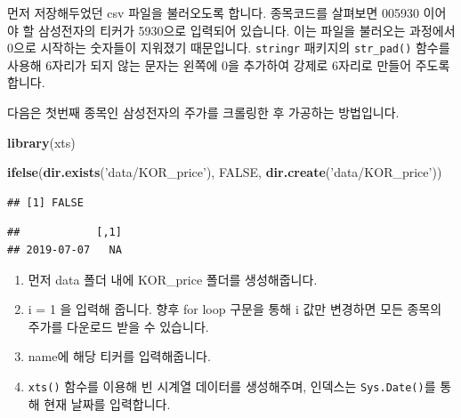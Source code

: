 \documentclass[12pt,]{book}
\newenvironment{Shaded}{\begin{snugshade}}{\end{snugshade}}
\newcommand{\DataTypeTok}[1]{\textcolor[rgb]{0.13,0.29,0.53}{#1}}
\newcommand{\DecValTok}[1]{\textcolor[rgb]{0.00,0.00,0.81}{#1}}
\newcommand{\KeywordTok}[1]{\textcolor[rgb]{0.13,0.29,0.53}{\textbf{#1}}}
\newcommand{\NormalTok}[1]{#1}
\newcommand{\OperatorTok}[1]{\textcolor[rgb]{0.81,0.36,0.00}{\textbf{#1}}}
\newcommand{\OtherTok}[1]{\textcolor[rgb]{0.56,0.35,0.01}{#1}}
\newcommand{\StringTok}[1]{\textcolor[rgb]{0.31,0.60,0.02}{#1}}
\providecommand{\tightlist}{%
  \setlength{\itemsep}{0pt}\setlength{\parskip}{0pt}}
\begin{document}
먼저 저장해두었던 csv 파일을 불러오도록 합니다. 종목코드를 살펴보면 005930 이어야 할 삼성전자의 티커가 5930으로 입력되어 있습니다. 이는 파일을 불러오는 과정에서 0으로 시작하는 숫자들이 지워졌기 때문입니다. \texttt{stringr} 패키지의 \texttt{str\_pad()} 함수를 사용해 6자리가 되지 않는 문자는 왼쪽에 0을 추가하여 강제로 6자리로 만들어 주도록 합니다.

다음은 첫번째 종목인 삼성전자의 주가를 크롤링한 후 가공하는 방법입니다.

\begin{Shaded}
\begin{Highlighting}[]
\KeywordTok{library}\NormalTok{(xts)}

\KeywordTok{ifelse}\NormalTok{(}\KeywordTok{dir.exists}\NormalTok{(}\StringTok{'data/KOR_price'}\NormalTok{), }\OtherTok{FALSE}\NormalTok{,}
       \KeywordTok{dir.create}\NormalTok{(}\StringTok{'data/KOR_price'}\NormalTok{))}
\end{Highlighting}
\end{Shaded}

\begin{verbatim}
## [1] FALSE
\end{verbatim}

\begin{Shaded}
\end{Shaded}

\begin{verbatim}
##            [,1]
## 2019-07-07   NA
\end{verbatim}

\begin{enumerate}
\def\labelenumi{\arabic{enumi}.}
\tightlist
\item
  먼저 data 폴더 내에 KOR\_price 폴더를 생성해줍니다.
\item
  i = 1 을 입력해 줍니다. 향후 for loop 구문을 통해 i 값만 변경하면 모든 종목의 주가를 다운로드 받을 수 있습니다.
\item
  name에 해당 티커를 입력해줍니다.
\item
  \texttt{xts()} 함수를 이용해 빈 시계열 데이터를 생성해주며, 인덱스는 \texttt{Sys.Date()}를 통해 현재 날짜를 입력합니다.
\end{enumerate}
\end{document}
